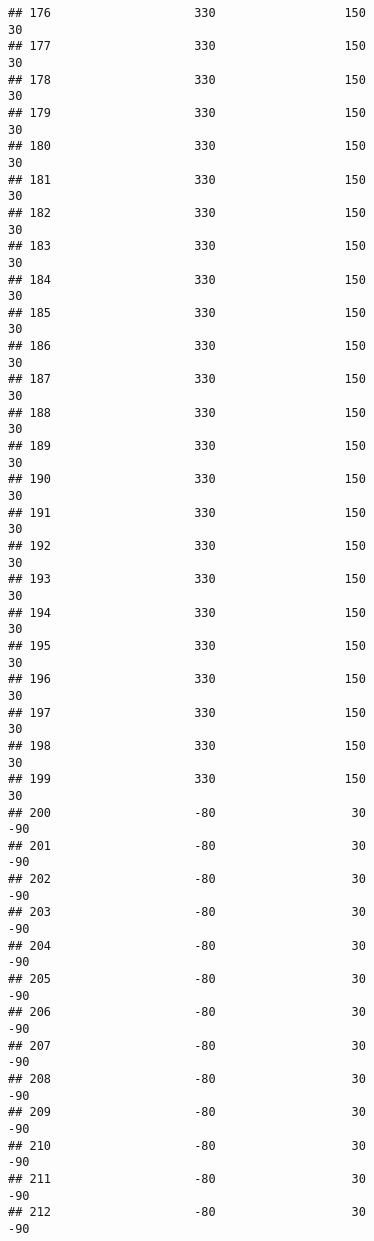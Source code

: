 \documentclass[]{article}
\begin{document}
\begin{verbatim}
## 176                    330                  150                   30
## 177                    330                  150                   30
## 178                    330                  150                   30
## 179                    330                  150                   30
## 180                    330                  150                   30
## 181                    330                  150                   30
## 182                    330                  150                   30
## 183                    330                  150                   30
## 184                    330                  150                   30
## 185                    330                  150                   30
## 186                    330                  150                   30
## 187                    330                  150                   30
## 188                    330                  150                   30
## 189                    330                  150                   30
## 190                    330                  150                   30
## 191                    330                  150                   30
## 192                    330                  150                   30
## 193                    330                  150                   30
## 194                    330                  150                   30
## 195                    330                  150                   30
## 196                    330                  150                   30
## 197                    330                  150                   30
## 198                    330                  150                   30
## 199                    330                  150                   30
## 200                    -80                   30                  -90
## 201                    -80                   30                  -90
## 202                    -80                   30                  -90
## 203                    -80                   30                  -90
## 204                    -80                   30                  -90
## 205                    -80                   30                  -90
## 206                    -80                   30                  -90
## 207                    -80                   30                  -90
## 208                    -80                   30                  -90
## 209                    -80                   30                  -90
## 210                    -80                   30                  -90
## 211                    -80                   30                  -90
## 212                    -80                   30                  -90

\end{verbatim}
\end{document}
